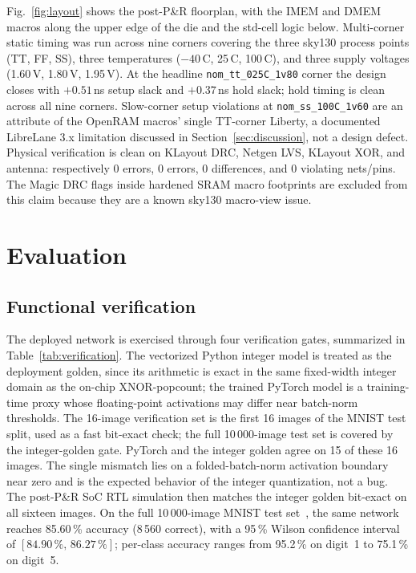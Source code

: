 \documentclass[conference]{IEEEtran}
\begin{document}
Fig.~\ref{fig:layout} shows the post-P\&R floorplan, with the IMEM
and DMEM macros along the upper edge of the die and the std-cell logic
below. Multi-corner static timing was run across nine corners covering
the three sky130 process points (TT, FF, SS), three temperatures
($-40$\,\textdegree{}C, 25\,\textdegree{}C, 100\,\textdegree{}C), and
three supply voltages (1.60\,V, 1.80\,V, 1.95\,V). At the headline
\texttt{nom\_tt\_025C\_1v80} corner the design closes with
$+0.51$\,ns setup slack and $+0.37$\,ns hold slack; hold timing is
clean across all nine corners. Slow-corner setup violations at
\texttt{nom\_ss\_100C\_1v60} are an attribute of the OpenRAM macros'
single TT-corner Liberty, a documented LibreLane 3.x limitation
discussed in Section~\ref{sec:discussion}, not a design defect.
Physical verification is clean on KLayout DRC, Netgen LVS, KLayout
XOR, and antenna: respectively 0 errors, 0 errors, 0 differences,
and 0 violating nets/pins. The Magic DRC flags inside hardened SRAM
macro footprints are excluded from this claim because they are a
known sky130 macro-view issue.

\section{Evaluation}
\label{sec:eval}

\subsection{Functional verification}
\label{sec:eval:verif}

The deployed network is exercised through four verification gates,
summarized in Table~\ref{tab:verification}. The vectorized Python
integer model is treated as the deployment golden, since its
arithmetic is exact in the same fixed-width integer
domain as the on-chip XNOR-popcount; the trained PyTorch model is a
training-time proxy whose floating-point activations may differ near
batch-norm thresholds. The 16-image verification set is the first
16 images of the MNIST test split, used as a fast bit-exact check; the
full 10\,000-image test set is covered by the integer-golden gate.
PyTorch and the integer golden agree on 15 of these 16 images. The
single mismatch lies on a folded-batch-norm activation
boundary near zero and is the expected behavior of the integer
quantization, not a bug. The post-P\&R SoC RTL simulation then matches
the integer golden bit-exact on all sixteen images. On the full
10\,000-image MNIST test set~\cite{lecun1998gradient}, the same network reaches
85.60\,\% accuracy (8\,560 correct), with a 95\,\% Wilson confidence interval of
\([84.90\,\%,\,86.27\,\%]\); per-class accuracy ranges from 95.2\,\%
on digit~1 to 75.1\,\% on digit~5.

\end{document}
